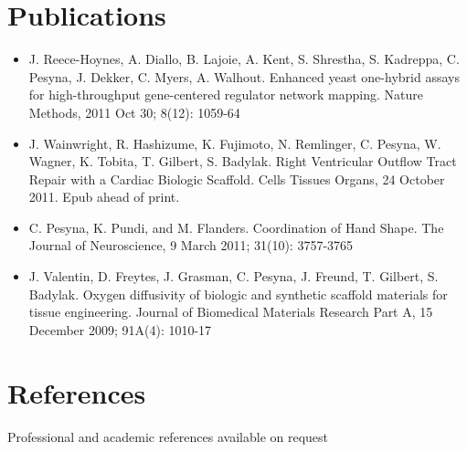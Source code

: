 \documentclass[margin,line]{resume}
\begin{document}
\begin{resume}
    \section{\mysidestyle Publications}

    \begin{itemize}
    \item J. Reece-Hoynes, A. Diallo, B. Lajoie, A. Kent, S. Shrestha, S. Kadreppa, C. Pesyna, J. Dekker, C. Myers, A. Walhout. Enhanced yeast one-hybrid assays for high-throughput gene-centered regulator network mapping. Nature Methods, 2011 Oct 30; 8(12): 1059-64
    \item J. Wainwright, R. Hashizume, K. Fujimoto, N. Remlinger, C. Pesyna, W. Wagner, K. Tobita, T. Gilbert, S. Badylak. Right Ventricular Outflow Tract Repair with a Cardiac Biologic Scaffold. Cells Tissues Organs, 24 October 2011. Epub ahead of print.
    \item C. Pesyna, K. Pundi, and M. Flanders. Coordination of Hand Shape. The Journal of Neuroscience, 9 March 2011; 31(10): 3757-3765
    \item J. Valentin, D. Freytes, J. Grasman, C. Pesyna, J. Freund, T. Gilbert, S. Badylak. Oxygen diffusivity of biologic and synthetic scaffold materials for tissue engineering. Journal of Biomedical Materials Research Part A, 15 December 2009; 91A(4): 1010-17
    \end{itemize}

    \section{\mysidestyle References} 
    {Professional and academic references available on request}

\end{resume}
\end{document}
